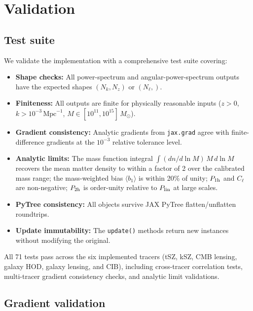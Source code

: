 \documentclass[12pt, preprint]{aastex631}
\begin{document}
\section{Validation}
\label{sec:validation}

\subsection{Test suite}

We validate the implementation with a comprehensive test suite covering:
\begin{itemize}
    \item \textbf{Shape checks:} All power-spectrum and angular-power-spectrum outputs have the expected shapes $(N_k, N_z)$ or $(N_\ell,)$.
    \item \textbf{Finiteness:} All outputs are finite for physically reasonable inputs ($z > 0$, $k > 10^{-3}\,\mathrm{Mpc}^{-1}$, $M \in [10^{11}, 10^{15}]\,M_\odot$).
    \item \textbf{Gradient consistency:} Analytic gradients from \texttt{jax.grad} agree with finite-difference gradients at the $10^{-3}$ relative tolerance level.
    \item \textbf{Analytic limits:} The mass function integral $\int (dn/d\ln M)\,M\,d\ln M$ recovers the mean matter density to within a factor of 2 over the calibrated mass range; the mass-weighted bias $\langle b_1 \rangle$ is within 20\% of unity; $P_{\rm 1h}$ and $C_\ell$ are non-negative; $P_{\rm 2h}$ is order-unity relative to $P_{\rm lin}$ at large scales.
    \item \textbf{PyTree consistency:} All objects survive JAX PyTree flatten/unflatten roundtrips.
    \item \textbf{Update immutability:} The \texttt{update()} methods return new instances without modifying the original.
\end{itemize}

All 71 tests pass across the six implemented tracers (tSZ, kSZ, CMB lensing, galaxy HOD, galaxy lensing, and CIB), including cross-tracer correlation tests, multi-tracer gradient consistency checks, and analytic limit validations.

\subsection{Gradient validation}
\end{document}
